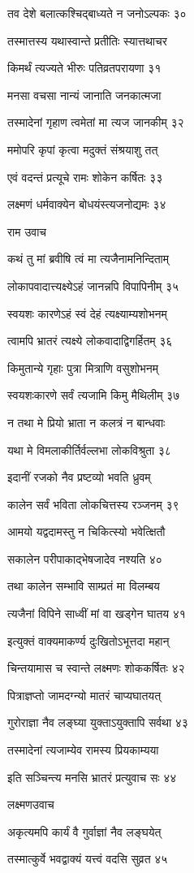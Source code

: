तव देशे बलात्कश्चिद्बाध्यते न जनोऽल्पकः ३०

तस्मात्तस्य यथास्वान्ते प्रतीतिः स्यात्तथाचर

किमर्थं त्यज्यते भीरुः पतिव्रतपरायणा ३१

मनसा वचसा नान्यं जानाति जनकात्मजा

तस्मादेनां गृहाण त्वमेतां मा त्यज जानकीम् ३२

ममोपरि कृपां कृत्वा मदुक्तं संश्रयाशु तत्

एवं वदन्तं प्रत्यूचे रामः शोकेन कर्षितः ३३

लक्ष्मणं धर्मवाक्येन बोधयंस्त्यजनोद्यमः ३४

राम उवाच

कथं तु मां ब्रवीषि त्वं मा त्यजैनामनिन्दिताम्

लोकापवादात्त्यक्ष्येऽहं जानन्नपि विपापिनीम् ३५

स्वयशः कारणेऽहं स्वं देहं त्यक्ष्याम्यशोभनम्

त्वामपि भ्रातरं त्यक्ष्ये लोकवादाद्विगर्हितम् ३६

किमुतान्ये गृहाः पुत्रा मित्राणि वसुशोभनम्

स्वयशःकारणे सर्वं त्यजामि किमु मैथिलीम् ३७

न तथा मे प्रियो भ्राता न कलत्रं न बान्धवाः

यथा मे विमलाकीर्तिर्वल्लभा लोकविश्रुता ३८

इदानीं रजको नैव प्रष्टव्यो भवति ध्रुवम्

कालेन सर्वं भविता लोकचित्तस्य रञ्जनम् ३९

आमयो यद्वदामस्तु न चिकित्स्यो भवेत्क्षितौ

सकालेन परीपाकाद्भेषजादेव नश्यति ४०

तथा कालेन सम्भावि साम्प्रतं मा विलम्बय

त्यजैनां विपिने साध्वीं मां वा खड्गेन घातय ४१

इत्युक्तं वाक्यमाकर्ण्य दुःखितोऽभूत्तदा महान्

चिन्तयामास च स्वान्ते लक्ष्मणः शोककर्षितः ४२

पित्राज्ञप्तो जामदग्न्यो मातरं चाप्यघातयत्

गुरोराज्ञा नैव लङ्घ्या युक्ताऽयुक्तापि सर्वथा ४३

तस्मादेनां त्यजाम्येव रामस्य प्रियकाम्यया

इति सञ्चिन्त्य मनसि भ्रातरं प्रत्युवाच सः ४४

लक्ष्मणउवाच

अकृत्यमपि कार्यं वै गुर्वाज्ञां नैव लङ्घयेत्

तस्मात्कुर्वे भवद्वाक्यं यत्त्वं वदसि सुव्रत ४५

